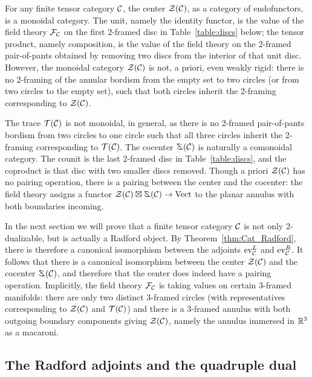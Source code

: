\documentclass{amsart}
\begin{document}
\begin{remark}
For any finite tensor category $\mathcal C$, the center $\mathcal Z(\mathcal C)$, as a category of endofunctors, is a monoidal category.  The unit, namely the identity functor, is the value of the field theory $\mathcal F_\mathcal C$ on the first 2-framed disc in Table~\ref{table:discs} below; the tensor product, namely composition, is the value of the field theory on the 2-framed pair-of-pants obtained by removing two discs from the interior of that unit disc.  However, the monoidal category $\mathcal Z(\mathcal C)$ is not, a priori, even weakly rigid: there is no 2-framing of the annular bordism from the empty set to two circles (or from two circles to the empty set), such that both circles inherit the 2-framing corresponding to $\mathcal Z(\mathcal C)$.  

The trace $\mathcal T(\mathcal C)$ is not monoidal, in general, as there is no 2-framed pair-of-pants bordism from two circles to one circle such that all three circles inherit the 2-framing corresponding to $\mathcal T(\mathcal C)$.  The cocenter $\coZ(\cC)$ is naturally a comonoidal category.  The counit is the last 2-framed disc in Table~\ref{table:discs}, and the coproduct is that disc with two smaller discs removed.  Though a priori $\mathcal Z(\mathcal C)$ has no pairing operation, there is a pairing between the center and the cocenter: the field theory assigns a functor $\cZ(\cC) \boxtimes \coZ(\cC) \ra \Vect$ to the planar annulus with both boundaries incoming.

In the next section we will prove that a finite tensor category $\mathcal C$ is not only 2-dualizable, but is actually a Radford object.  By Theorem~\ref{thm:Cat_Radford}, there is therefore a canonical isomorphism between the adjoints $\mathrm{ev}^L_\mathcal C$ and $\mathrm{ev}^R_\mathcal C$.  It follows that there is a canonical isomorphism between the center $\mathcal Z(\mathcal C)$ and the cocenter $\coZ(\cC)$, and therefore that the center does indeed have a pairing operation.  Implicitly, the field theory $\mathcal F_\mathcal C$ is taking values on certain 3-framed manifolds: there are only two distinct 3-framed circles (with representatives corresponding to $\mathcal Z(\mathcal C)$ and $\mathcal T(\mathcal C)$) and there is a 3-framed annulus with both outgoing boundary components giving $\mathcal Z(\mathcal C)$, namely the annulus immersed in $\mathbb R^3$ as a macaroni.
\end{remark}

\subsection{The Radford adjoints and the quadruple dual} \label{sec:radfordftc}
\end{document}
